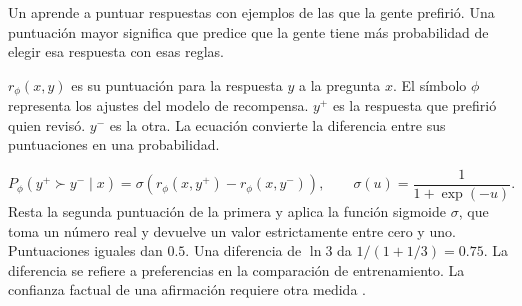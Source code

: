 {Un  aprende a puntuar respuestas con ejemplos de las que la gente prefirió. Una puntuación mayor significa que predice que la gente tiene más probabilidad de elegir esa respuesta con esas reglas.

\moremath
\(r_\phi(x,y)\) es su puntuación para la respuesta \(y\) a la pregunta \(x\). El símbolo \(\phi\) representa los ajustes del modelo de recompensa. \(y^+\) es la respuesta que prefirió quien revisó. \(y^-\) es la otra. La ecuación convierte la diferencia entre sus puntuaciones en una probabilidad.}
\begin{equation}
 P_\phi(y^+\succ y^-\mid x)=
 \sigma\!\left(r_\phi(x,y^+)-r_\phi(x,y^-)\right),
 \qquad \sigma(u)=\frac{1}{1+\exp(-u)} .
 \label{eq:preference}
\end{equation}
{Resta la segunda puntuación de la primera y aplica la función sigmoide \(\sigma\), que toma un número real y devuelve un valor estrictamente entre cero y uno. Puntuaciones iguales dan \(0.5\). Una diferencia de \(\ln 3\) da \(1/(1+1/3)=0.75\). La diferencia se refiere a preferencias en la comparación de entrenamiento. La confianza factual de una afirmación requiere otra medida \citep{instruct,dpo}.}

\section{}

